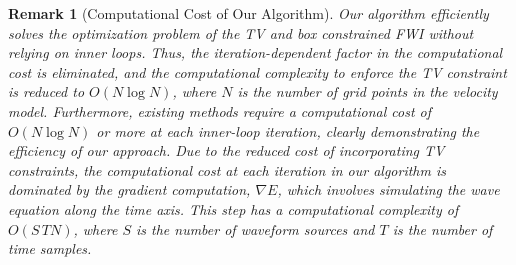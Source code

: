 \newtheorem{theorem}{Remark}
\begin{theorem}[Computational Cost of Our Algorithm]
Our algorithm efficiently solves the optimization problem of the TV and box constrained FWI without relying on inner loops.
Thus, the iteration-dependent factor in the computational cost is eliminated, and the computational complexity to enforce the TV constraint is reduced to $O(N \log N)$, where $N$ is the number of grid points in the velocity model.
Furthermore, existing methods require a computational cost of $O(N \log N)$ or more at each inner-loop iteration, clearly demonstrating the efficiency of our approach.
Due to the reduced cost of incorporating TV constraints, the computational cost at each iteration in our algorithm is dominated by the gradient computation, $\nabla E$, which involves simulating the wave equation along the time axis.
This step has a computational complexity of $O(S\, TN)$, where $S$ is the number of waveform sources and $T$ is the number of time samples.
\end{theorem}






